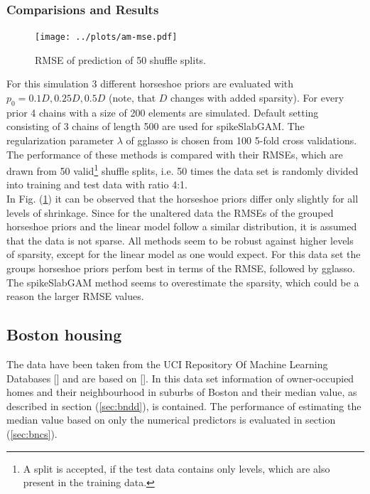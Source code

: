 \documentclass[12pt,letterpaper]{article}
\numberwithin{equation}{subsection}
\begin{document}
\subsubsection{Comparisions and Results}
\label{sec:amcs}
\begin{figure}[hbt!]
 \centering
 \texttt{[image: ../plots/am-mse.pdf]}
 \caption[RMSE of prediction (automobile)]{RMSE of prediction of 50 shuffle splits.}
 \label{fig:am-mse}
\end{figure}
For this simulation 3 different horseshoe priors are evaluated with $p_0 = 0.1D, 0.25D, 0.5D$ (note, that $D$ changes with added sparsity).  For every prior 4 chains with a size of 200 elements are simulated. Default setting consisting of 3 chains of length 500 are used for spikeSlabGAM. The regularization parameter $\lambda$ of gglasso is chosen from 100 5-fold cross validations.
The performance of these methods is compared with their RMSEs, which are drawn from 50 valid\footnote{A split is accepted, if the test data contains only  levels, which are also present in the training data.}  shuffle splits, i.e. 50 times the data set is randomly divided into training and test data with ratio 4:1. \\
In Fig. (\ref{fig:am-mse}) it can be observed that the horseshoe priors differ only slightly for all levels of shrinkage.
Since for the unaltered data the RMSEs of the grouped horseshoe priors and the linear model follow a similar distribution, it is assumed that the data is not sparse. All methods seem to be robust against higher levels of sparsity, except for the linear model as one would expect. For this data set the groups horseshoe priors perfom best in terms of the RMSE, followed by gglasso. The spikeSlabGAM method seems to overestimate the sparsity, which could be a reason the larger RMSE values.
\FloatBarrier
\subsection{Boston housing}
\label{sec:bn}
The data have been taken from the UCI Repository Of Machine Learning Databases [\cite{uci}] and are based on [\cite{boston}]. In this data set information of owner-occupied homes and their neighbourhood in suburbs of Boston and their median value, as described in section (\ref{sec:bndd}), is contained. The performance of estimating the median value based on only the numerical predictors is evaluated in section (\ref{sec:bncs}). 
\end{document}
